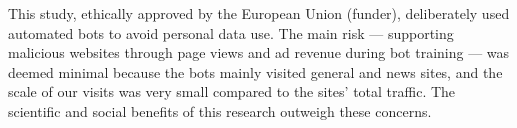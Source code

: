 This study, ethically approved by the European Union (funder), deliberately used automated bots to avoid personal data use. The main risk — supporting malicious websites through page views and ad revenue during bot training — was deemed minimal because the bots mainly visited general and news sites, and the scale of our visits was very small compared to the sites' total traffic. The scientific and social benefits of this research outweigh these concerns.



